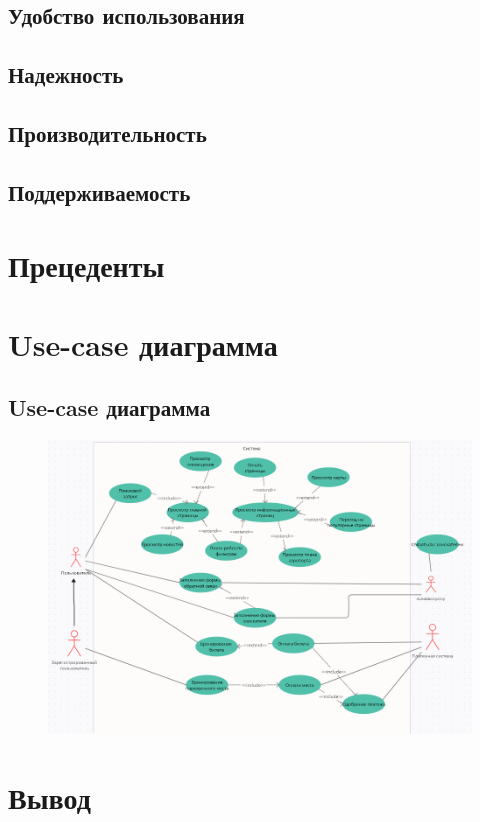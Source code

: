 \documentclass{article}
\begin{document}
  \subsection{Удобство использования}
  

  \subsection{Надежность}
  

  \subsection{Производительность}
  

  \subsection{Поддерживаемость}
  

\section{Прецеденты}


\newpage
\section{Use-case диаграмма}

  \subsection{Use-case диаграмма}
  \begin{figure}[h]
    \includegraphics[width=\textwidth]{use-case-diagram/Use-case.png}
    \centering
  \end{figure}

\section{Вывод}

  
\end{document}

